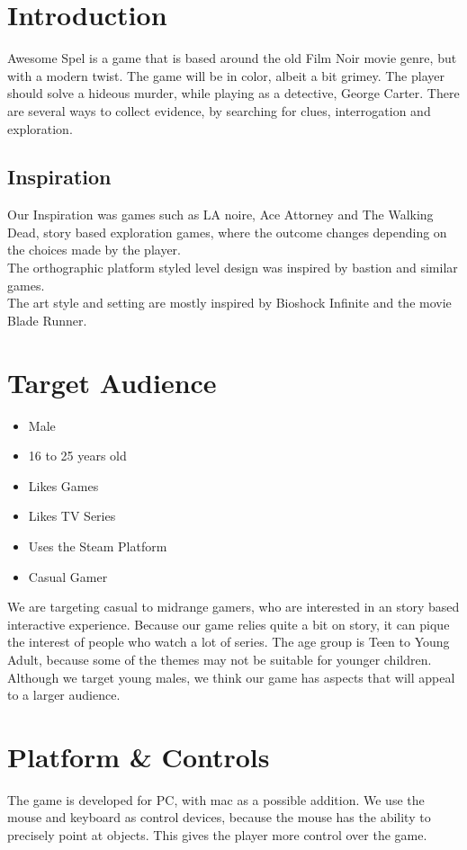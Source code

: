 \documentclass{article}
\begin{document}
	\newpage

\section{Introduction}
	Awesome Spel is a game that is based around the old Film Noir movie genre, but with a modern twist. The game will be in color, albeit a bit grimey. The player should solve a hideous murder, while playing as a detective, George Carter. There are several ways to collect evidence, by searching for clues, interrogation and exploration.

	\subsection{Inspiration}
		Our Inspiration was games such as LA noire, Ace Attorney and The Walking Dead, story based exploration games, where the outcome changes depending on the choices made by the player.\\
		The orthographic platform styled level design was inspired by bastion and similar games.\\
		The art style and setting are mostly inspired by Bioshock Infinite and the movie Blade Runner.
\section{Target Audience}
	\begin{itemize}
		\item Male
		\item 16 to 25 years old
		\item Likes Games
		\item Likes TV Series
		\item Uses the Steam Platform
		\item Casual Gamer
	\end{itemize}
	We are targeting casual to midrange gamers, who are interested in an story based interactive experience. Because our game relies quite a bit on story, it can pique the interest of people who watch a lot of series. The age group is Teen to Young Adult, because some of the themes may not be suitable for younger children. Although we target young males, we think our game has aspects that will appeal to a larger audience.


\section{Platform \& Controls}
	The game is developed for PC, with mac as a possible addition. We use the mouse and keyboard as control devices, because the mouse has the ability to precisely point at objects. This gives the player more control over the game.
\end{document}
